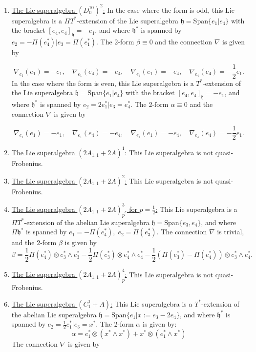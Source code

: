 \documentclass[12pt]{amsart}
\newcommand{\fh}{\mathfrak{h}}
\begin{document}
\begin{enumerate}
    \[\nabla_{e_1}(e_1) =- e_1,\quad  \nabla_{e_1}(e_4) = -  e_4, \quad  \nabla_{e_4}(e_1) = - e_4, \quad \nabla_{e_4}(e_4) = \frac{1}{2}e_1.\]

    \item \underline{The Lie superalgebra $(D^{10}_{0})^2$:} In the case where the form is odd, this Lie superalgebra is a $\Pi T^*$-extension of the Lie superalgebra $\mathfrak{h}=\mathrm{Span}\{e_1 | e_4\}$ with the bracket $[e_4,e_4]_\fh = -e_1$, and where $\mathfrak{h}^*$ is spanned by $e_2 = - \Pi(e_4^{*}) | e_3 = \Pi(e_1^{*})$. The 2-form $\beta \equiv 0$ and the connection $\nabla$ is given by
    
    \[\nabla_{e_1}(e_1) =- e_1,\quad  \nabla_{e_1}(e_4) = -  e_4, \quad  \nabla_{e_4}(e_1) = - e_4, \quad \nabla_{e_4}(e_4) = -\frac{1}{2}e_1.\]
    In the case where the form is even, this Lie superalgebra is a $T^*$-extension of the Lie superalgebra $\mathfrak{h}=\mathrm{Span}\{e_1 | e_4\}$ with the bracket $[e_4,e_4]_\fh = -e_1$, and where $\mathfrak{h}^*$ is spanned by $e_2 = 2 e_1^{*} | e_3 = e_4^{*}$. The 2-form $\alpha   \equiv 0$ and the connection $\nabla$ is given by
    
    \[\nabla_{e_1}(e_1) =- e_1,\quad  \nabla_{e_1}(e_4) = -  e_4, \quad  \nabla_{e_4}(e_1) = - e_4, \quad \nabla_{e_4}(e_4) = -\frac{1}{2}e_1.\]

    \item \underline{The Lie superalgebra $(2A_{1,1}+2A)^1$:} This Lie superalgebra is not quasi-Frobenius. 
    \item \underline{The Lie superalgebra $(2A_{1,1}+2A)^2$:} This Lie superalgebra is not quasi-Frobenius. 
    \item \underline{The Lie superalgebra $(2A_{1,1}+2A)^3_p$, for $p=\frac{1}{2}$:} This Lie superalgebra is a $\Pi T^*$-extension of the abelian Lie superalgebra $\mathfrak{h}=\mathrm{Span}\{e_3 , e_4\}$, and where $\Pi \mathfrak{h}^*$ is spanned by $e_1 = -\Pi(e_4^*) , \;  e_2 = \Pi(e_3^{*})$. The connection $\nabla$ is trivial, and the 2-form $\beta$ is given by  
    \[
\beta=\frac{1}{2} \Pi (e_4^*)\otimes  e_3^* \wedge e_3^* -\frac{1}{2} \Pi (e_3^*)\otimes  e_4^* \wedge e_4^*- \frac{1}{2} (\Pi(e_3^*)- \Pi(e_4^*) )\otimes e_3^*\wedge e_4^*.
    \]
    \item \underline{The Lie superalgebra $(2A_{1,1}+2A)^4_p$:} This Lie superalgebra is not quasi-Frobenius. 

    \item \underline{The Lie superalgebra $(C^1_1+A)$:} This Lie superalgebra is a $ T^*$-extension of the abelian Lie superalgebra $\mathfrak{h}=\mathrm{Span}\{e_1 | x:=e_3-2e_4\}$, and where $\mathfrak{h}^*$ is spanned by $e_2 = \frac{1}{2}e_1^{*} | e_3 = x^{*}$. The 2-form $\alpha $ is given by:
    \[ \alpha = e^*_1 \otimes (x^* \wedge x^*) +x^* \otimes (e^*_1 \wedge x^*)\]
    The connection $\nabla$ is given by
    

\end{enumerate}
\end{document}
